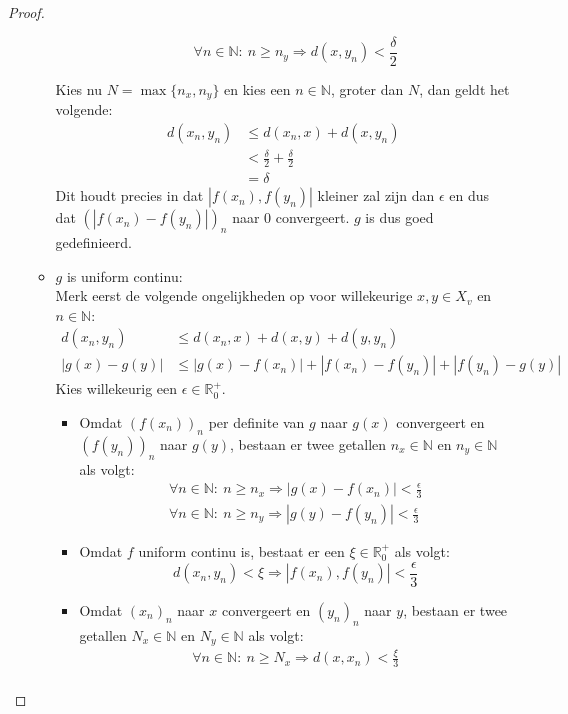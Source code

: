 \documentclass[main.tex]{subfiles}
\begin{document}
\begin{st}
\begin{proof}
\begin{itemize}
\begin{itemize}
\begin{itemize}
          \[ \forall n\in\mathbb{N}:\ n \ge n_{y} \Rightarrow d(x,y_{n}) < \frac{\delta}{2} \]
        \end{itemize}
        Kies nu $N = \max\{ n_{x}, n_{y}\}$ en kies een $n\in\mathbb{N}$, groter dan $N$, dan geldt het volgende:
        \begin{align*}
          d(x_{n},y_{n})
          &\le d(x_{n},x) + d(x,y_{n})\\
          &< \frac{\delta}{2} + \frac{\delta}{2}\\
          &= \delta
        \end{align*}
        Dit houdt precies in dat $|f(x_{n}),f(y_{n})|$ kleiner zal zijn dan $\epsilon$ en dus dat $\left(|f(x_{n})-f(y_{n})|\right)_{n}$ naar $0$ convergeert.
        $g$ is dus goed gedefinieerd.
      \item $g$ is uniform continu:\\
        Merk eerst de volgende ongelijkheden op voor willekeurige $x,y\in X_{v}$ en $n\in\mathbb{N}$:
        \begin{align*}
          d(x_{n},y_{n}) &\le d(x_{n},x) + d(x,y) + d(y,y_{n})\\
          |g(x)-g(y)| &\le |g(x)-f(x_{n})| + |f(x_{n})-f(y_{n})| + |f(y_{n})-g(y)|
        \end{align*}
        Kies willekeurig een $\epsilon\in\mathbb{R}_{0}^{+}$.
        \begin{itemize}
        \item 
          Omdat $(f(x_{n}))_{n}$ per definite van $g$ naar $g(x)$ convergeert en $(f(y_{n}))_{n}$ naar $g(y)$, bestaan er twee getallen $n_{x}\in\mathbb{N}$ en $n_{y}\in\mathbb{N}$ als volgt:
          \begin{align*}
            \forall n\in\mathbb{N}:\ n\ge n_{x}\Rightarrow |g(x)-f(x_{n})| < \frac{\epsilon}{3}\\
            \forall n\in\mathbb{N}:\ n\ge n_{y}\Rightarrow |g(y)-f(y_{n})| < \frac{\epsilon}{3}
          \end{align*}
        \item Omdat $f$ uniform continu is, bestaat er een $\xi\in\mathbb{R}_{0}^{+}$ als volgt:
          \[ d(x_{n},y_{n}) < \xi \Rightarrow |f(x_{n}),f(y_{n})| < \frac{\epsilon}{3} \]
        \item Omdat $(x_{n})_{n}$ naar $x$ convergeert en $(y_{n})_{n}$ naar $y$, bestaan er twee getallen $N_{x}\in\mathbb{N}$ en $N_{y}\in\mathbb{N}$ als volgt:
          \begin{align*}
            \forall n\in\mathbb{N}:\ n\ge N_{x}\Rightarrow d(x,x_{n}) < \frac{\xi}{3}\\

\end{align*}
\end{itemize}
\end{itemize}
\end{itemize}
\end{proof}
\end{st}
\end{document}
